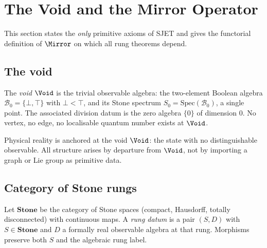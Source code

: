 \section{The Void and the Mirror Operator}
\label{sec:void-mirror}

This section states the \emph{only} primitive axioms of SJET and gives the
functorial definition of $\Mirror$ on which all rung theorems depend.

\subsection{The void}
\label{sec:void-mirror:void}

\begin{definition}[Void]\label{def:void-mirror:void}
The \emph{void} $\Void$ is the trivial observable algebra: the two-element
Boolean algebra $\mathcal{B}_0=\{\bot,\top\}$ with $\bot<\top$, and its Stone
spectrum $S_0=\mathrm{Spec}(\mathcal{B}_0)$, a single point. The associated
division datum is the zero algebra $\{0\}$ of dimension $0$. No vertex, no
edge, no localisable quantum number exists at $\Void$.
\end{definition}

\begin{axiom}[Void]\label{ax:void-mirror:void}
Physical reality is anchored at the void $\Void$: the state with no
distinguishable observable. All structure arises by departure from $\Void$, not
by importing a graph or Lie group as primitive data.
\end{axiom}

\subsection{Category of Stone rungs}
\label{sec:void-mirror:category}

\begin{definition}\label{def:void-mirror:StoneCat}
Let $\mathbf{Stone}$ be the category of Stone spaces (compact, Hausdorff,
totally disconnected) with continuous maps. A \emph{rung datum} is a pair
$(S,D)$ with $S\in\mathbf{Stone}$ and $D$ a formally real observable algebra
at that rung. Morphisms preserve both $S$ and the algebraic rung label.
\end{definition}


